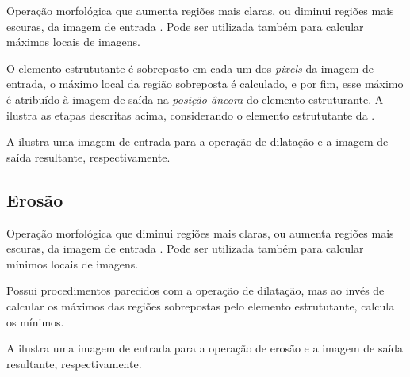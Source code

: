 \par Operação morfológica que aumenta regiões mais claras, ou diminui regiões mais escuras, da imagem de entrada \cite{gonsalez2006}. Pode ser utilizada também para calcular máximos locais de imagens.

\par O elemento estrututante é sobreposto em cada um dos \textit{pixels} da imagem de entrada, o máximo local da região sobreposta é calculado, e por fim, esse máximo é atribuído à imagem de saída na \textit{posição âncora} do elemento estruturante. A  ilustra as etapas descritas acima, considerando o elemento estrututante da .


\par A  ilustra uma imagem de entrada para a operação de dilatação e a imagem de saída resultante, respectivamente.

%

\subsection{Erosão} \label{sec:morf:ero}

\par Operação morfológica que diminui regiões mais claras, ou aumenta regiões mais escuras, da imagem de entrada \cite{gonsalez2006}. Pode ser utilizada também para calcular mínimos locais de imagens.

\par Possui procedimentos parecidos com a operação de dilatação, mas ao invés de calcular os máximos das regiões sobrepostas pelo elemento estrututante, calcula os mínimos.

\par A  ilustra uma imagem de entrada para a operação de erosão e a imagem de saída resultante, respectivamente.

%

